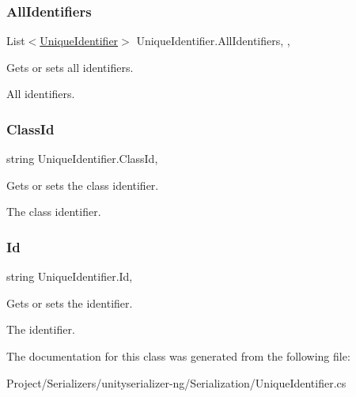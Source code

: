 \subsubsection{\texorpdfstring{All\+Identifiers}{AllIdentifiers}}
{\footnotesize\ttfamily List$<$\hyperlink{class_unique_identifier}{Unique\+Identifier}$>$ Unique\+Identifier.\+All\+Identifiers\hspace{0.3cm}{\ttfamily [static]}, {\ttfamily [get]}, {\ttfamily [set]}}



Gets or sets all identifiers. 

All identifiers.\mbox{\label{class_unique_identifier_aa02e26cc7965fbe902f0309a2a69ad9d}} 
\subsubsection{\texorpdfstring{Class\+Id}{ClassId}}
{\footnotesize\ttfamily string Unique\+Identifier.\+Class\+Id\hspace{0.3cm}{\ttfamily [get]}, {\ttfamily [set]}}



Gets or sets the class identifier. 

The class identifier.\mbox{\label{class_unique_identifier_a5ba479bcdc803e239625d2b699695451}} 
\subsubsection{\texorpdfstring{Id}{Id}}
{\footnotesize\ttfamily string Unique\+Identifier.\+Id\hspace{0.3cm}{\ttfamily [get]}, {\ttfamily [set]}}



Gets or sets the identifier. 

The identifier.

The documentation for this class was generated from the following file\+:\begin{DoxyCompactItemize}
\item 
Project/\+Serializers/unityserializer-\/ng/\+Serialization/Unique\+Identifier.\+cs\end{DoxyCompactItemize}

